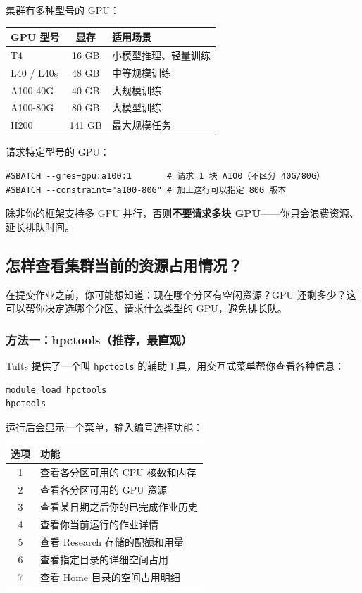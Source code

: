 集群有多种型号的 GPU：

\begin{table}[h]
\centering
\begin{tabular}{lcl}
\toprule
GPU 型号 & 显存 & 适用场景 \\
\midrule
T4 & 16 GB & 小模型推理、轻量训练 \\
L40 / L40s & 48 GB & 中等规模训练 \\
A100-40G & 40 GB & 大规模训练 \\
A100-80G & 80 GB & 大模型训练 \\
H200 & 141 GB & 最大规模任务 \\
\bottomrule
\end{tabular}
\end{table}

请求特定型号的 GPU：

\begin{lstlisting}[language=slurm]
#SBATCH --gres=gpu:a100:1       # 请求 1 块 A100（不区分 40G/80G）
#SBATCH --constraint="a100-80G" # 加上这行可以指定 80G 版本
\end{lstlisting}

\begin{warnbox}
除非你的框架支持多 GPU 并行，否则\textbf{不要请求多块 GPU}——你只会浪费资源、延长排队时间。
\end{warnbox}

\subsection{怎样查看集群当前的资源占用情况？}

在提交作业之前，你可能想知道：现在哪个分区有空闲资源？GPU 还剩多少？这可以帮你决定选哪个分区、请求什么类型的 GPU，避免排长队。

\subsubsection{方法一：hpctools（推荐，最直观）}

Tufts 提供了一个叫 \texttt{hpctools} 的辅助工具，用交互式菜单帮你查看各种信息：

\begin{lstlisting}[language=bash]
module load hpctools
hpctools
\end{lstlisting}

运行后会显示一个菜单，输入编号选择功能：

\begin{table}[h]
\centering
\begin{tabular}{cl}
\toprule
选项 & 功能 \\
\midrule
1 & 查看各分区可用的 CPU 核数和内存 \\
2 & 查看各分区可用的 GPU 资源 \\
3 & 查看某日期之后你的已完成作业历史 \\
4 & 查看你当前运行的作业详情 \\
5 & 查看 Research 存储的配额和用量 \\
6 & 查看指定目录的详细空间占用 \\
7 & 查看 Home 目录的空间占用明细 \\
\bottomrule
\end{tabular}
\end{table}

